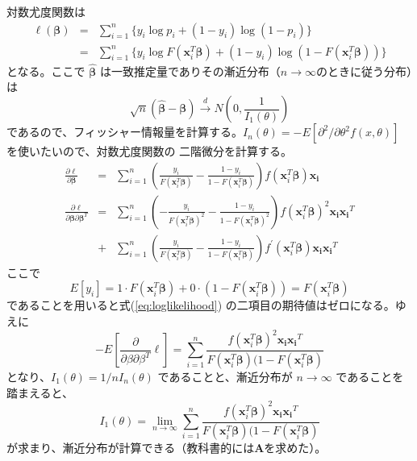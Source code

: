 \documentclass[10pt, a4paper]{ltjsarticle}
\newcommand\refeq[1]{式(\ref{#1})}
\begin{document}
対数尤度関数は
\begin{eqnarray}
  \ell(\bm{\beta}) &=& \sum_{i=1}^n \{y_i\log p_i + (1-y_i)\log(1-p_i) \} \\
  &=& \sum_{i=1}^n \{y_i\log F(\bm{x}_i^T\bm{\beta}) + (1-y_i)\log(1-F(\bm{x}_i^T\bm{\beta})) \}
\end{eqnarray}
となる。ここで $\hat{\bm{\beta}}$ は一致推定量でありその漸近分布（$n\to\infty$のときに従う分布）は
\begin{equation}
  \sqrt{n}(\hat{\bm{\beta}}-\bm{\beta}) \xrightarrow{d} N \left(0, \frac{1}{I_1(\theta)}\right)
\end{equation}
であるので、フィッシャー情報量を計算する。$I_n(\theta)=-E[\partial^2/\partial\theta^2f(x,\theta)]$ を使いたいので、対数尤度関数の
二階微分を計算する。
\begin{eqnarray}
  \frac{\partial \ell}{\partial\bm{\beta}} &=& \sum_{i=1}^n \left(\frac{y_i}{F(\bm{x}_i^T\bm{\beta})} - \frac{1-y_i}{1-F(\bm{x}_i^T\bm{\beta})} \right) 
  f(\bm{x}_i^T\bm{\beta})\bm{x_i} \\
  \frac{\partial \ell}{\partial\bm{\beta}\partial\bm{\beta}^T} &=& \sum_{i=1}^n \left(-\frac{y_i}{F(\bm{x}_i^T\bm{\beta})^2} - \frac{1-y_i}{1-F(\bm{x}_i^T\bm{\beta})^2} \right) 
  f(\bm{x}_i^T\bm{\beta})^2\bm{x_i}\bm{x_i}^T  \nonumber \\
  &+&\sum_{i=1}^n\left(\frac{y_i}{F(\bm{x}_i^T\bm{\beta})} - \frac{1-y_i}{1-F(\bm{x}_i^T\bm{\beta})} \right) f^\prime(\bm{x}_i^T\bm{\beta})\bm{x_i}\bm{x_i}^T
  \label{eq:loglikelihood}
\end{eqnarray}
ここで
\begin{equation}
  E[y_i] = 1\cdot F(\bm{x}_i^T\bm{\beta}) + 0\cdot (1-F(\bm{x}_i^T\bm{\beta})) = F(\bm{x}_i^T\bm{\beta})
\end{equation}
であることを用いると\refeq{eq:loglikelihood} の二項目の期待値はゼロになる。ゆえに
\begin{equation}
  -E\left[\frac{\partial}{\partial\beta\partial\beta^T} \ell \right] = 
  \sum_{i=1}^n \frac{f(\bm{x}_i^T\bm{\beta})^2\bm{x_i}\bm{x_i}^T}{F(\bm{x}_i^T\bm{\beta})(1-F(\bm{x}_i^T\bm{\beta})}
\end{equation}
となり、$I_1(\theta) = 1/nI_n(\theta)$ であることと、漸近分布が $n\to\infty$ であることを踏まえると、
\begin{equation}
  I_1(\theta) = \lim_{n\to\infty} \sum_{i=1}^n \frac{f(\bm{x}_i^T\bm{\beta})^2\bm{x_i}\bm{x_i}^T}{F(\bm{x}_i^T\bm{\beta})(1-F(\bm{x}_i^T\bm{\beta})}
\end{equation}
が求まり、漸近分布が計算できる（教科書的には$\bm{A}$を求めた）。
\end{document}
